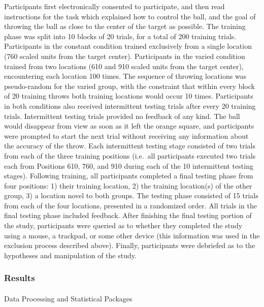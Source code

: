 \documentclass[
  11pt,
  letterpaper,
]{article}
\makeatletter
\let\oldparagraph\paragraph
\renewcommand{\paragraph}{
    \@ifstar
      \xxxParagraphStar
      \xxxParagraphNoStar
  }
\newcommand{\xxxParagraphStar}[1]{\oldparagraph*{#1}\mbox{}}
\newcommand{\xxxParagraphNoStar}[1]{\oldparagraph{#1}\mbox{}}
\makeatother
\begin{document}
Participants first electronically consented to participate, and then
read instructions for the task which explained how to control the ball,
and the goal of throwing the ball as close to the center of the target
as possible. The training phase was split into 10 blocks of 20 trials,
for a total of 200 training trials. Participants in the constant
condition trained exclusively from a single location (760 scaled units
from the target center). Participants in the varied condition trained
from two locations (610 and 910 scaled units from the target center),
encountering each location 100 times. The sequence of throwing locations
was pseudo-random for the varied group, with the constraint that within
every block of 20 training throws both training locations would occur 10
times. Participants in both conditions also received intermittent
testing trials after every 20 training trials. Intermittent testing
trials provided no feedback of any kind. The ball would disappear from
view as soon as it left the orange square, and participants were
prompted to start the next trial without receiving any information about
the accuracy of the throw. Each intermittent testing stage consisted of
two trials from each of the three training positions (i.e.~all
participants executed two trials each from Positions 610, 760, and 910
during each of the 10 intermittent testing stages). Following training,
all participants completed a final testing phase from four positions: 1)
their training location, 2) the training location(s) of the other group,
3) a location novel to both groups. The testing phase consisted of 15
trials from each of the four locations, presented in a randomized order.
All trials in the final testing phase included feedback. After finishing
the final testing portion of the study, participants were queried as to
whether they completed the study using a mouse, a trackpad, or some
other device (this information was used in the exclusion process
described above). Finally, participants were debriefed as to the
hypotheses and manipulation of the study.

\subsubsection{Results}\label{results}

\paragraph{Data Processing and Statistical
Packages}\label{data-processing-and-statistical-packages}
\end{document}
